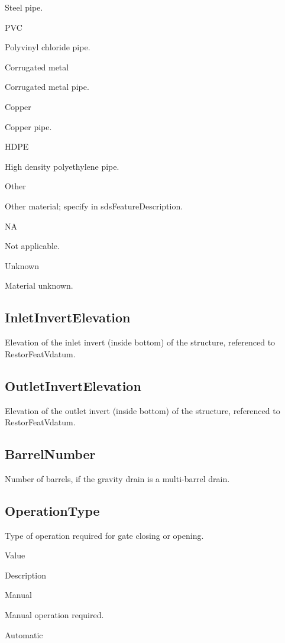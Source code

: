 \documentclass[
  letterpaper,
  DIV=11,
  numbers=noendperiod]{scrreprt}
\begin{document}
Steel pipe.

PVC

Polyvinyl chloride pipe.

Corrugated metal

Corrugated metal pipe.

Copper

Copper pipe.

HDPE

High density polyethylene pipe.

Other

Other material; specify in sdsFeatureDescription.

NA

Not applicable.

Unknown

Material unknown.

\subsection{InletInvertElevation}\label{inletinvertelevation}

Elevation of the inlet invert (inside bottom) of the structure,
referenced to RestorFeatVdatum.

\subsection{OutletInvertElevation}\label{outletinvertelevation}

Elevation of the outlet invert (inside bottom) of the structure,
referenced to RestorFeatVdatum.

\subsection{BarrelNumber}\label{barrelnumber}

Number of barrels, if the gravity drain is a multi-barrel drain.

\subsection{OperationType}\label{operationtype}

Type of operation required for gate closing or opening.

Value

Description

Manual

Manual operation required.

Automatic
\end{document}
